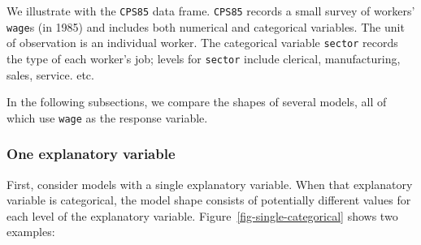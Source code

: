 \documentclass[
  letterpaper,
  DIV=11,
  numbers=noendperiod,
  oneside]{scrartcl}
\begin{document}
We illustrate with the \texttt{CPS85} data frame. \texttt{CPS85} records
a small survey of workers' \texttt{wage}s (in 1985) and includes both
numerical and categorical variables. The unit of observation is an
individual worker. The categorical variable \texttt{sector} records the
type of each worker's job; levels for \texttt{sector} include clerical,
manufacturing, sales, service. etc.

In the following subsections, we compare the shapes of several models,
all of which use \texttt{wage} as the response variable.

\subsubsection{One explanatory variable}\label{one-explanatory-variable}

First, consider models with a single explanatory variable. When that
explanatory variable is categorical, the model shape consists of
potentially different values for each level of the explanatory variable.
Figure~\ref{fig-single-categorical} shows two examples:
\end{document}
